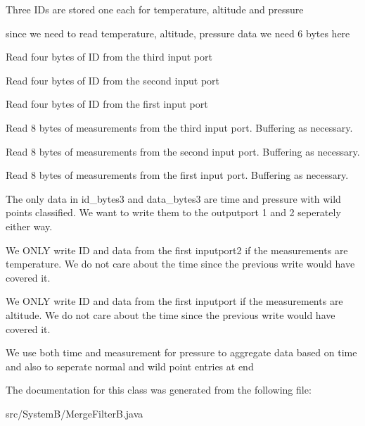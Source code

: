 Three I\+D\textquotesingle{}s are stored one each for temperature, altitude and pressure

since we need to read temperature, altitude, pressure data we need 6 bytes here

Read four bytes of I\+D from the third input port

Read four bytes of I\+D from the second input port

Read four bytes of I\+D from the first input port

Read 8 bytes of measurements from the third input port. Buffering as necessary.

Read 8 bytes of measurements from the second input port. Buffering as necessary.

Read 8 bytes of measurements from the first input port. Buffering as necessary.

The only data in id\+\_\+bytes3 and data\+\_\+bytes3 are time and pressure with wild points classified. We want to write them to the outputport 1 and 2 seperately either way.

We O\+N\+L\+Y write I\+D and data from the first inputport2 if the measurements are temperature. We do not care about the time since the previous write would have covered it.

We O\+N\+L\+Y write I\+D and data from the first inputport if the measurements are altitude. We do not care about the time since the previous write would have covered it.

We use both time and measurement for pressure to aggregate data based on time and also to seperate normal and wild point entries at end

The documentation for this class was generated from the following file\+:\begin{DoxyCompactItemize}
\item 
src/\+System\+B/Merge\+Filter\+B.\+java\end{DoxyCompactItemize}

